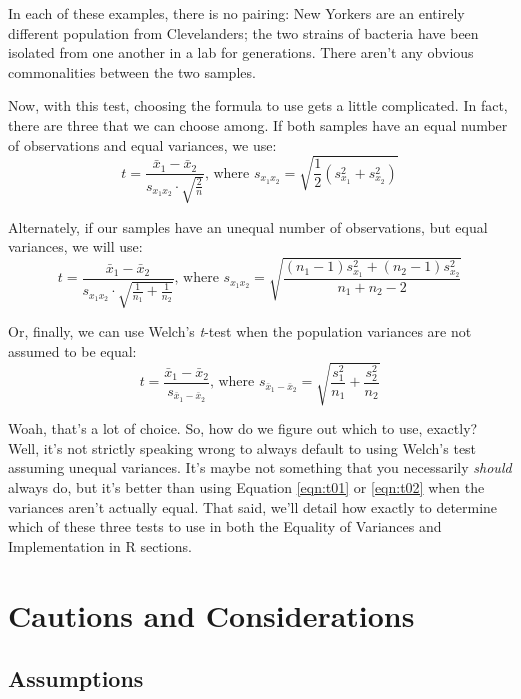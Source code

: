 In each of these examples, there is no pairing: New Yorkers are an entirely different population from Clevelanders; the two strains of bacteria have been isolated from one another in a lab for generations. There aren't any obvious commonalities between the two samples.

Now, with this test, choosing the formula to use gets a little complicated. In fact, there are three that we can choose among. If both samples have an equal number of observations and equal variances, we use:
\begin{equation}
t = \frac{\bar {x}_1 - \bar{x}_2}{s_{x_1x_2} \cdot \sqrt{\frac{2}{n}}}\text{, where }s_{x_1x_2} = \sqrt{\frac{1}{2}(s_{x_1}^2+s_{x_2}^2)}
\label{eqn:t01}
\end{equation}

Alternately, if our samples have an unequal number of observations, but equal variances, we will use:
\begin{equation}
t = \frac{\bar {x}_1 - \bar{x}_2}{s_{x_1x_2} \cdot \sqrt{\frac{1}{n_1}+\frac{1}{n_2}}}\text{, where }s_{x_1x_2} = \sqrt{\frac{(n_1-1)s_{x_1}^2+(n_2-1)s_{x_2}^2}{n_1+n_2-2}}
\label{eqn:t02}
\end{equation}

Or, finally, we can use Welch's \textit{t}-test when the population variances are not assumed to be equal:
\begin{equation}
t = {\frac{\bar{x}_1 - \bar{x}_2}{s_{\bar{x}_1 - \bar{x}_2}}}\text{, where }s_{\bar{x}_1 - \bar{x}_2} = \sqrt{\frac{s_1^2}{n_1} + \frac{s_2^2}{n_2}}
\label{eqn:t03}
\end{equation}

Woah, that's a lot of choice. So, how do we figure out which to use, exactly? Well, it's not strictly speaking wrong to always default to using Welch's test assuming unequal variances. It's maybe not something that you necessarily \textit{should} always do, but it's better than using Equation \ref{eqn:t01} or \ref{eqn:t02} when the variances aren't actually equal. That said, we'll detail how exactly to determine which of these three tests to use in both the Equality of Variances and Implementation in R sections.
\section{Cautions and Considerations}

\subsection{Assumptions}

